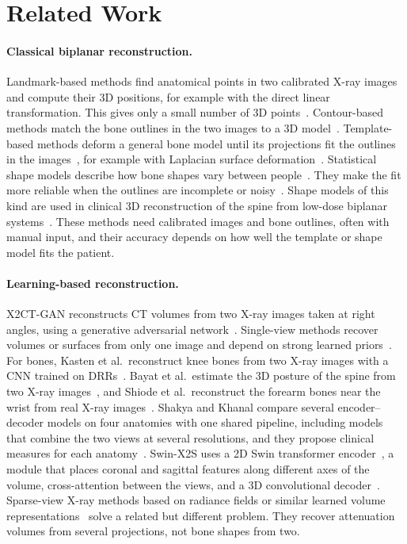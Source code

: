 \documentclass[11pt]{article}
\begin{document}
\section{Related Work}

\paragraph{Classical biplanar reconstruction.}
Landmark-based methods find anatomical points in two calibrated X-ray images and compute their 3D positions, for example with the direct linear transformation. This gives only a small number of 3D points~\cite{zhang2010}. Contour-based methods match the bone outlines in the two images to a 3D model~\cite{laporte2003}. Template-based methods deform a general bone model until its projections fit the outlines in the images~\cite{gunay2007}, for example with Laplacian surface deformation~\cite{karade2015}. Statistical shape models describe how bone shapes vary between people~\cite{heimann2009}. They make the fit more reliable when the outlines are incomplete or noisy~\cite{zheng2009,baka2011}. Shape models of this kind are used in clinical 3D reconstruction of the spine from low-dose biplanar systems~\cite{humbert2009,melhem2016}. These methods need calibrated images and bone outlines, often with manual input, and their accuracy depends on how well the template or shape model fits the patient.

\paragraph{Learning-based reconstruction.}
X2CT-GAN reconstructs CT volumes from two X-ray images taken at right angles, using a generative adversarial network~\cite{ying2019}. Single-view methods recover volumes or surfaces from only one image and depend on strong learned priors~\cite{henzler2018,shen2019,gu2024}. For bones, Kasten et al.\ reconstruct knee bones from two X-ray images with a CNN trained on DRRs~\cite{kasten2020}. Bayat et al.\ estimate the 3D posture of the spine from two X-ray images~\cite{bayat2020}, and Shiode et al.\ reconstruct the forearm bones near the wrist from real X-ray images~\cite{shiode2021}. Shakya and Khanal compare several encoder--decoder models on four anatomies with one shared pipeline, including models that combine the two views at several resolutions, and they propose clinical measures for each anatomy~\cite{shakya2023}. Swin-X2S uses a 2D Swin transformer encoder~\cite{swin2021}, a module that places coronal and sagittal features along different axes of the volume, cross-attention between the views, and a 3D convolutional decoder~\cite{liuk2025}. Sparse-view X-ray methods based on radiance fields or similar learned volume representations~\cite{cai2024,wang2025xfield} solve a related but different problem. They recover attenuation volumes from several projections, not bone shapes from two.
\end{document}
